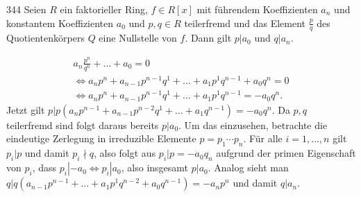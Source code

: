 \begin{algebraUE}{344}
Seien $R$ ein faktorieller Ring, $f \in R[x]$ mit führendem Koeffizienten $a_n$
und konstantem Koeffizienten $a_0$ und $p,q \in R$ teilerfremd und das Element
$\frac{p}{q}$ des Quotientenkörpers $Q$ eine Nullstelle von $f$. Dann gilt $p|a_0$
und $q | a_n$.
\end{algebraUE}

\begin{solution}
\begin{align*}
  a_n \frac{p^n}{q^n} + \dots + a_0 = 0 \\
  \iff a_np^n + a_{n-1}p^{n-1}q^1 + \dots + a_1p^1q^{n-1} + a_0q^n = 0 \\
  \iff a_np^n + a_{n-1}p^{n-1}q^1 + \dots + a_1p^1q^{n-1} = -a_0q^n.
\end{align*}
Jetzt gilt $p | p(a_np^{n-1} + a_{n-1}p^{n-2}q^1 + \dots + a_1q^{n-1}) = -a_0q^n$.
Da $p,q$ teilerfremd sind folgt daraus bereits $p | a_0$.
Um das einzusehen, betrachte die eindeutige Zerlegung in irreduzible Elemente $p = p_1\cdots p_n$.
Für alle $i = 1,\dots,n$ gilt $p_i | p$ und damit $p_i \nmid q$, also folgt aus $p_i | p = -a_0q_n$
aufgrund der primen Eigenschaft von $p_i$, dass $p_i | -a_0 \iff p_i | a_0$, also insgesamt $p | a_0$.
Analog sieht man $q |q(a_{n-1}p^{n-1} + \dots + a_1p^1q^{n-2} + a_0q^{n-1}) = -a_np^n$
und damit $q | a_n$.

\end{solution}
